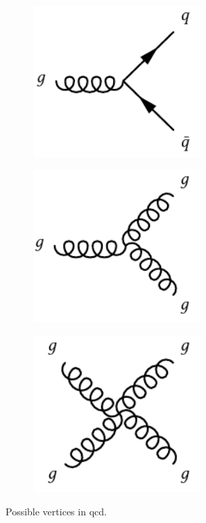 \begin{figure}
	\centering
	\begin{subfigure}[b]{0.30\linewidth}
		\centering\includegraphics[width=0.7\textwidth]{gluon_quark_vertex}
	\end{subfigure}%
	\begin{subfigure}[b]{0.30\linewidth}
		\centering\includegraphics[width=0.7\textwidth]{gluon_vertex}
	\end{subfigure}	
	\begin{subfigure}[b]{0.30\linewidth}
		\centering\includegraphics[width=0.7\textwidth]{gluon_quartic_vertex}
	\end{subfigure}
	\caption{Possible vertices in \gls{qcd}.}
	\label{fig:qcd_vertices}
\end{figure}

